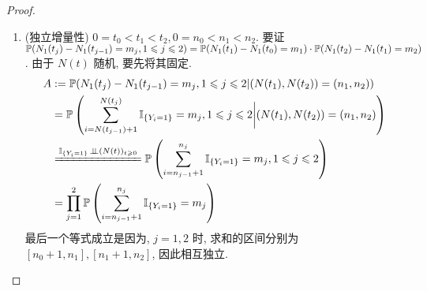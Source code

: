 \begin{proof}
\begin{enumerate}
    \item (独立增量性) $0=t_0<t_1<t_2,0=n_0<n_1<n_2$. 要证 $\mathbb{P}(N_1(t_j)-N_1(t_{j-1})=m_j,1\leqslant j\leqslant 2)=\mathbb{P}(N_1(t_1)-N_1(t_0)=m_1)\cdot\mathbb{P}(N_1(t_2)-N_1(t_1)=m_2)$. 由于 $N(t)$ 随机, 要先将其固定.
        \begin{equation}
        \begin{aligned}
            A&:=\PP(N_1(t_j)-N_1(t_{j-1})=m_j,1\leq j\leq 2|(N(t_1),N(t_2))=(n_1,n_2))\\
            &=\PP\left(\sum_{i=N(t_{j-1})+1}^{N(t_j)}\II_{\{Y_i=1\}}=m_j,1\leq j\leq 2\bigg|(N(t_1),N(t_2))=(n_1,n_2)\right)\\
            &\xlongequal{\II_{\{Y_i=1\}}\ind (N(t))_{t\geq 0}}\PP\left(\sum_{i=n_{j-1}+1}^{n_j}\II_{\{Y_i=1\}}=m_j,1\leq j\leq 2\right)\\
            &=\prod_{j=1}^2 \PP\left(\sum_{i=n_{j-1}+1}^{n_j}\II_{\{Y_i=1\}}=m_j\right)
        \end{aligned}
        \label{eq:p90-A}
        \end{equation}
        	最后一个等式成立是因为, $j=1,2$ 时, 求和的区间分别为 $[n_0+1,n_1],[n_1+1,n_2]$, 因此相互独立.
        	

\end{enumerate}
\end{proof}
